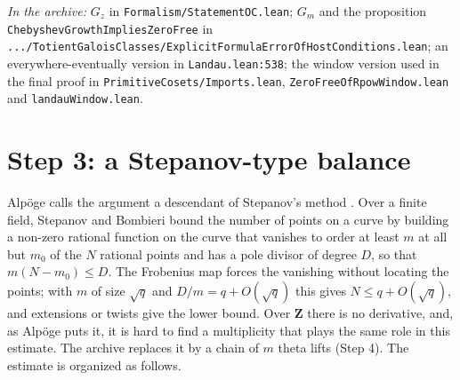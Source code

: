 \documentclass[11pt]{article}
\newcommand{\Lean}[1]{\texttt{\small #1}}
\newcommand{\inarch}[1]{\par{\small\raggedright\noindent\emph{In the archive:} #1\par}}
\newcommand{\Z}{\mathbf{Z}}
\begin{document}
\inarch{$G_z$ in \Lean{Formalism/StatementOC.lean}; $G_m$ and the proposition \Lean{ChebyshevGrowthImpliesZeroFree} in \Lean{.../TotientGaloisClasses/\-ExplicitFormulaError\-OfHostConditions.lean}; an everywhere-eventually version in \Lean{Landau.lean:538}; the window version used in the final proof in \Lean{PrimitiveCosets/Imports.lean}, \Lean{ZeroFreeOfRpowWindow.lean} and \Lean{landauWindow.lean}.}

\section{Step 3: a Stepanov-type balance}\label{sec:s3}
Alp\"oge calls the argument a descendant of Stepanov's method \cite{alpoge}. Over a finite field, Stepanov \cite{stepanov} and Bombieri \cite{bombieri} bound the number of points on a curve by building a non-zero rational function on the curve that vanishes to order at least $m$ at all but $m_0$ of the $N$ rational points and has a pole divisor of degree $D$, so that $m(N-m_0)\le D$. The Frobenius map forces the vanishing without locating the points; with $m$ of size $\sqrt q$ and $D/m=q+O(\sqrt q)$ this gives $N\le q+O(\sqrt q)$, and extensions or twists give the lower bound. Over $\Z$ there is no derivative, and, as Alp\"oge puts it, it is hard to find a multiplicity that plays the same role in this estimate. The archive replaces it by a chain of $m$ theta lifts (Step 4). The estimate is organized as follows.
\end{document}
